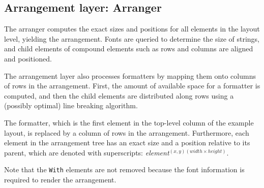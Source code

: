 %																
\subsection{Arrangement layer: Arranger} \label{sect:arranger}

The arranger computes the exact sizes and positions for all elements in the layout level, yielding the arrangement. Fonts are queried to determine the size of strings, and child elements of compound elements such as rows and columns are aligned and positioned.

The arrangement layer also processes formatters by mapping them onto columns of rows in the arrangement. First, the amount of available space for a formatter is computed, and then the child elements are distributed along rows using a (possibly optimal) line breaking algorithm.


 The formatter, which is the first element in the top-level column of the example layout, is replaced by a column of rows in the arrangement. Furthermore, each element in the arrangement tree has an exact size and a position relative to its parent, which are denoted with superscripts: {\em element}$^{(x,y)(\mathit{width}\times \mathit{height})}$. 

Note that the \verb|With| elements are not removed because the font information is required to render the arrangement.

